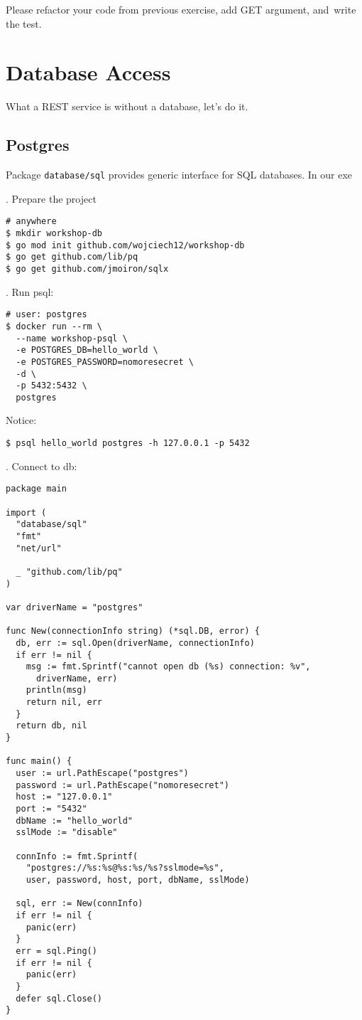 \documentclass[11pt, letterpaper]{article}
\begin{document}
Please refactor your code from previous exercise, add GET argument, and~write the test.

\section{Database Access}
What a {\small REST} service is without a database, let's do it.

\subsection{Postgres}

Package \verb|database/sql| provides generic interface for {\small SQL} databases. In our exe

. Prepare the project

\begin{verbatim}
# anywhere 
$ mkdir workshop-db
$ go mod init github.com/wojciech12/workshop-db
$ go get github.com/lib/pq
$ go get github.com/jmoiron/sqlx
\end{verbatim}

. Run psql:

\begin{verbatim}
# user: postgres
$ docker run --rm \
  --name workshop-psql \
  -e POSTGRES_DB=hello_world \
  -e POSTGRES_PASSWORD=nomoresecret \
  -d \
  -p 5432:5432 \
  postgres
\end{verbatim}

Notice:

\begin{verbatim}
$ psql hello_world postgres -h 127.0.0.1 -p 5432
\end{verbatim}

\bigskip
3. Connect to db:

\begin{verbatim}
package main

import (
  "database/sql"
  "fmt"
  "net/url"

  _ "github.com/lib/pq"
)

var driverName = "postgres"

func New(connectionInfo string) (*sql.DB, error) {
  db, err := sql.Open(driverName, connectionInfo)
  if err != nil {
    msg := fmt.Sprintf("cannot open db (%s) connection: %v", 
      driverName, err)
    println(msg)
    return nil, err
  }
  return db, nil
}

func main() {
  user := url.PathEscape("postgres")
  password := url.PathEscape("nomoresecret")
  host := "127.0.0.1"
  port := "5432"
  dbName := "hello_world"
  sslMode := "disable"

  connInfo := fmt.Sprintf(
    "postgres://%s:%s@%s:%s/%s?sslmode=%s",
    user, password, host, port, dbName, sslMode)

  sql, err := New(connInfo)
  if err != nil {
    panic(err)
  }
  err = sql.Ping()
  if err != nil {
    panic(err)
  }
  defer sql.Close()
}
\end{verbatim}
\end{document}
